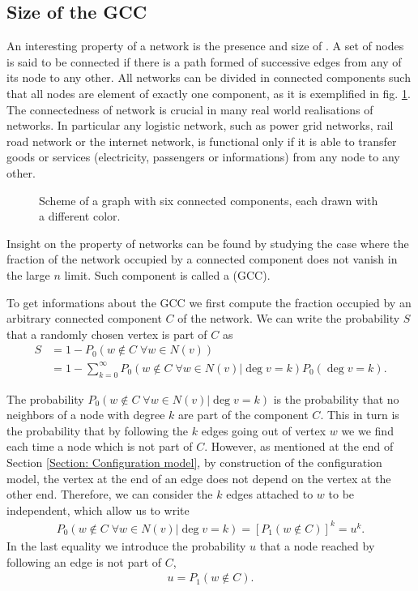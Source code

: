 \documentclass[
11pt, %
english, %
singlespacing, %
nolistspacing, %
liststotoc, %
headsepline, %
]{MastersDoctoralThesis} %
\begin{document}
\subsection{Size of the GCC}

An interesting property of a network is the presence and size of . A set of nodes is said to be connected if there is a path formed of successive edges from any of its node to any other. All networks can be divided in connected components such that all nodes are element of exactly one component, as it is exemplified in fig. \ref{Figure: Connected components}. The connectedness of network is crucial in many real world realisations of networks. In particular any logistic network, such as power grid networks, rail road network or the internet network, is functional only if it is able to transfer goods or services (electricity, passengers or informations) from any node to any other.

\begin{figure}
	
	\caption{Scheme of a graph with six connected components, each drawn with a different color.}
	\label{Figure: Connected components}
\end{figure}

Insight on the property of networks can be found by studying the case where the fraction of the network occupied by a connected component does not vanish in the large $n$ limit. Such component is called a  (GCC).

To get informations about the GCC we first compute the fraction occupied by an arbitrary connected component $C$ of the network. We can write the probability $S$ that a randomly chosen vertex is part of $C$ as
\begin{align}
	S 	&= 1 - P_0(w \notin C\; \forall w \in N(v))\\
		&= 1 - \sum_{k=0}^\infty P_0(w \notin C\; \forall w \in N(v)|\deg{v} = k) P_0(\deg{v} = k).
\end{align}

The probability $P_0(w \notin C\; \forall w \in N(v)|\deg{v} = k)$ is the probability that no neighbors of a node with degree $k$ are part of the component $C$. This in turn is the probability that by following the $k$ edges going out of vertex $w$ we we find each time a node which is not part of $C$. However, as mentioned at the end of Section \ref{Section: Configuration model}, by construction of the configuration model, the vertex at the end of an edge does not depend on the vertex at the other end. Therefore, we can consider the $k$ edges attached to $w$ to be independent, which allow us to write
\begin{align}
	P_0(w \notin C\; \forall w \in N(v)|\deg{v} = k) = \left[P_1(w \notin C)\right]^k = u^k. \label{Probability that a node of degree k is not in the GCC}
\end{align}
In the last equality we introduce the probability $u$ that a node reached by following an edge is not part of $C$,
\begin{align}
	u = P_1(w \notin C). \label{Definition of u}
\end{align}
\end{document}

